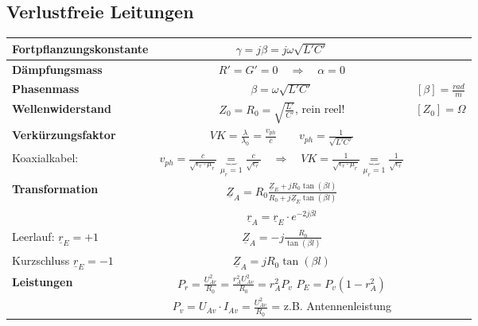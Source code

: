 	
	\subsection{Verlustfreie Leitungen}
		\renewcommand{\arraystretch}{1.5}
		\begin{tabular}{| l | c | c |}
			\hline
				\textbf{Fortpflanzungskonstante}
				& $\gamma=j\beta=j\omega \sqrt{L'C'} $
				&\\
			\hline
				\textbf{Dämpfungsmass}
				& $R'=G'=0\quad \Rightarrow \quad \alpha=0$
				&\\
			\hline
				\textbf{Phasenmass}
				& $\beta=\omega\sqrt{L'C'}$
				& $[\beta] = \frac{rad}{m}$\\
			\hline
				\textbf{Wellenwiderstand}
				& $Z_0 = R_0 =\sqrt{\frac{L'}{C'}}$, rein reel!
				& $[Z_0] = \Omega$\\
			\hline
				\textbf{Verkürzungsfaktor}
				& $ VK = \frac{\lambda}{\lambda_0}=\frac{v_{ph}}{c} \qquad v_{ph} = \frac{1}{\sqrt{L'C'}}$ &\\
				\hfill Koaxialkabel:& $v_{ph} = \frac{c}{\sqrt{\epsilon_r \cdot \mu_r}}  \underbrace{=}_{\mu_r = 1} \frac{c}{\sqrt{\epsilon_r}} \quad \Rightarrow \quad VK = \frac{1}{\sqrt{\epsilon_r \cdot \mu_r}} \underbrace{=}_{\mu_r = 1} \frac{1}{\sqrt{\epsilon_r}} $ & \\ 
			\hline
				\textbf{Transformation}
				& $\underline{Z}_A=R_0\frac{\underline{Z}_{E}+jR_0\tan(\beta l)}{R_0+j\underline{Z}_{E}\tan(\beta l)}$
				&\\
				& $\underline{r}_A=\underline{r}_E\cdot e^{-2j\beta l}$
				&\\
			\cline{2-3}
				\hfill Leerlauf: $ \underline{r}_E=+1$
				& $\underline{Z}_A=-j\frac{R_0}{\tan(\beta l)}$
				&\\
				\hfill Kurzschluss $ \underline{r}_E=-1$
				& $\underline{Z}_A=j R_0 \tan(\beta l)$
				&\\
			\hline
                 \textbf{Leistungen}
                 &
                 $P_r= \frac{U^2_{Ar}}{R_0}=\frac{r_A^2U^2_{Av}}{R_0}=r_A^2 P_v$\qquad
                 $P_{E}=P_v(1-r_A^2)$ & \\
                 & $P_v = U_{Av} \cdot               I_{Av} = \frac{U^2_{Av}}{R_0}$ = z.B. Antennenleistung &\\
             \hline
		\end{tabular}
